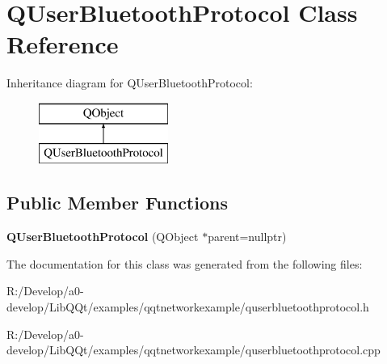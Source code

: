 \hypertarget{class_q_user_bluetooth_protocol}{}\section{Q\+User\+Bluetooth\+Protocol Class Reference}
\label{class_q_user_bluetooth_protocol}
Inheritance diagram for Q\+User\+Bluetooth\+Protocol\+:\begin{figure}[H]
\begin{center}
\leavevmode
\includegraphics[height=2.000000cm]{class_q_user_bluetooth_protocol}
\end{center}
\end{figure}
\subsection*{Public Member Functions}
\begin{DoxyCompactItemize}
\item 
\mbox{\label{class_q_user_bluetooth_protocol_a583b3e48e617e81b1329896bc7f28c13}} 
{\bfseries Q\+User\+Bluetooth\+Protocol} (Q\+Object $\ast$parent=nullptr)
\end{DoxyCompactItemize}


The documentation for this class was generated from the following files\+:\begin{DoxyCompactItemize}
\item 
R\+:/\+Develop/a0-\/develop/\+Lib\+Q\+Qt/examples/qqtnetworkexample/quserbluetoothprotocol.\+h\item 
R\+:/\+Develop/a0-\/develop/\+Lib\+Q\+Qt/examples/qqtnetworkexample/quserbluetoothprotocol.\+cpp\end{DoxyCompactItemize}
